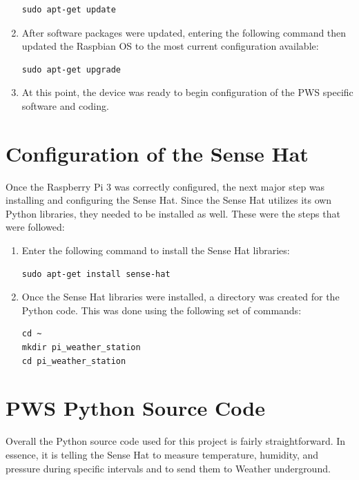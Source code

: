 \documentclass[sigconf]{acmart}
\begin{document}
\begin{enumerate}
\begin{verbatim}
sudo apt-get update
\end{verbatim}

\item After software packages were updated, entering the following command then updated the Raspbian OS to the most current configuration available:

\begin{verbatim}
sudo apt-get upgrade
\end{verbatim}

\item At this point, the device was ready to begin configuration of the PWS specific software and coding.
\end{enumerate}

\section{Configuration of the Sense Hat}

Once the Raspberry Pi 3 was correctly configured, the next major step was installing and configuring the Sense Hat. Since the Sense Hat utilizes its own Python libraries, they needed to be installed as well. These were the steps that were followed:

\begin{enumerate}
\item Enter the following command to install the Sense Hat libraries:

\begin{verbatim}
sudo apt-get install sense-hat
\end{verbatim}

\item Once the Sense Hat libraries were installed, a directory was created for the Python code. This was done using the following set of commands:

\begin{verbatim}
cd ~
mkdir pi_weather_station
cd pi_weather_station
\end{verbatim}

\end{enumerate}

\section{PWS Python Source Code}

Overall the Python source code used for this project is fairly straightforward\cite{WundergroundPython2017}. In essence, it is telling the Sense Hat to measure temperature, humidity, and pressure during specific intervals and to send them to Weather underground. 
\end{document}
